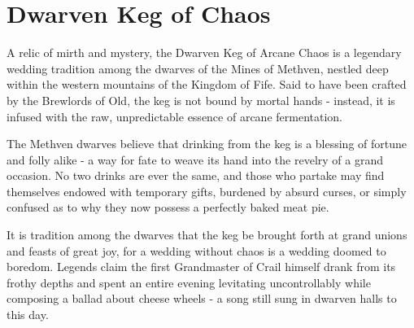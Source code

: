 \section*{Dwarven Keg of Chaos}
{\entryfont A relic of mirth and mystery, the Dwarven Keg of Arcane Chaos is a legendary wedding tradition among the dwarves of the Mines of Methven, nestled deep within the western mountains of the Kingdom of Fife. Said to have been crafted by the Brewlords of Old, the keg is not bound by mortal hands - instead, it is infused with the raw, unpredictable essence of arcane fermentation.

The Methven dwarves believe that drinking from the keg is a blessing of fortune and folly alike - a way for fate to weave its hand into the revelry of a grand occasion. No two drinks are ever the same, and those who partake may find themselves endowed with temporary gifts, burdened by absurd curses, or simply confused as to why they now possess a perfectly baked meat pie.

It is tradition among the dwarves that the keg be brought forth at grand unions and feasts of great joy, for a wedding without chaos is a wedding doomed to boredom. Legends claim the first Grandmaster of Crail himself drank from its frothy depths and spent an entire evening levitating uncontrollably while composing a ballad about cheese wheels - a song still sung in dwarven halls to this day.}
%
